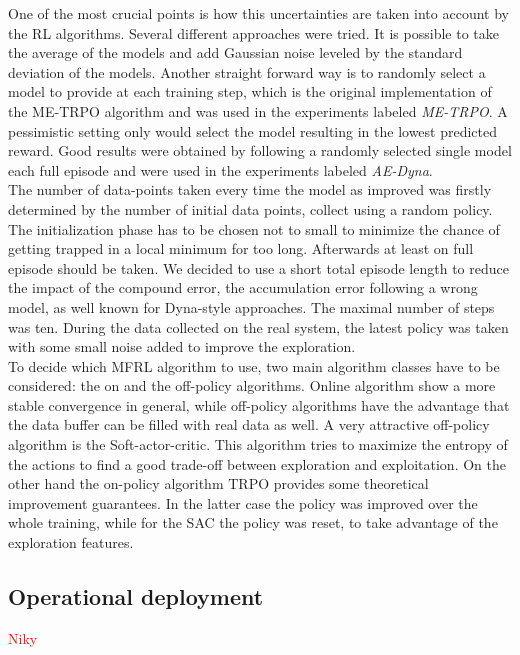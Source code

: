 \documentclass[
 reprint,
 amsmath,amssymb,amsfonts,clevref,
 aps,
prstab,
]{revtex4-2}
\newcommand{\NB}[1]{\textcolor{red}{#1}}
\begin{document}
One of the most crucial points is how this uncertainties are taken into account by the RL algorithms. Several different approaches were tried. It is possible to take the average of the models and add Gaussian noise leveled by the standard deviation of the models. Another straight forward way is to randomly select a model to provide at each training step, which is the original implementation of the ME-TRPO algorithm and was used in the experiments labeled \emph{ME-TRPO}. A pessimistic setting only would select the model resulting in the lowest predicted reward. Good results were obtained by following a randomly selected single model each full episode and were used in the experiments labeled \emph{AE-Dyna}.\\
The number of data-points taken every time the model as improved was firstly determined by the number of initial data points, collect using a random policy. The initialization phase has to be chosen not to small to minimize the chance of getting trapped in a local minimum for too long. Afterwards at least on full episode should be taken. We decided to use a short total episode length to reduce the impact of the compound error, the accumulation error following a wrong model, as well known for Dyna-style approaches. The maximal number of steps was ten. During the data collected on the real system, the latest policy was taken with some small noise added to improve the exploration.\\
To decide which MFRL algorithm to use, two main algorithm classes have to be considered: the on and the off-policy algorithms. Online algorithm show a more stable convergence in general, while off-policy algorithms have the advantage that the data buffer can be filled with real data as well. A very attractive off-policy algorithm is the Soft-actor-critic. This algorithm tries to maximize the entropy of the actions to find a good trade-off between exploration and exploitation. On the other hand the on-policy algorithm TRPO provides some theoretical improvement guarantees. In the latter case the policy was improved over the whole training, while for the SAC the policy was reset, to take advantage of the exploration features.

\subsection{Operational deployment}
\NB{Niky} %
\end{document}
